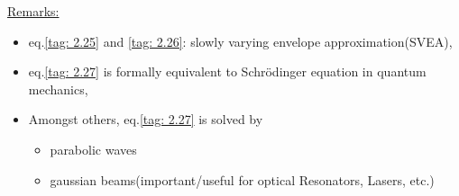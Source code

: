         \underline{Remarks:}
        \begin{itemize}
            \item eq.\ref{tag: 2.25} and \ref{tag: 2.26}: slowly varying envelope approximation(SVEA),
            \item eq.\ref{tag: 2.27} is formally equivalent to Schrödinger equation in quantum mechanics,
            \item Amongst others, eq.\ref{tag: 2.27} is solved by 
            \begin{itemize}
                \item parabolic waves
                \item gaussian beams(important/useful for optical Resonators, Lasers, etc.)
            \end{itemize}
        \end{itemize}
